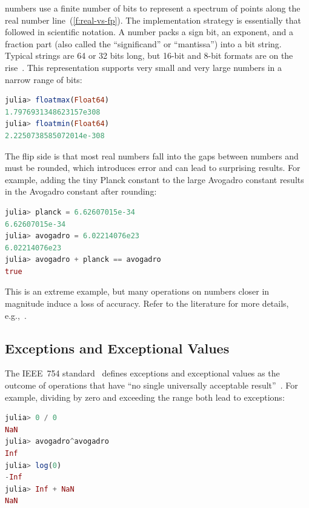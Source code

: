 \documentclass{juliacon}
\begin{document}
\Fp{} numbers use a finite number of bits to represent a spectrum of points along the real number line~(\cref{f:real-vs-fp}).
The implementation strategy is essentially that followed in scientific notation.
A \fp{} number packs a sign bit, an exponent, and a fraction part (also called the ``significand'' or ``mantissa'') into a bit string.
Typical strings are 64 or 32 bits long, but 16-bit and 8-bit formats are on the rise~\cite{klowerLowprecisionClimateComputing2021,fp8,p3109}.
This representation supports very small and very large numbers in a narrow range of bits:

\begin{lstlisting}[language = Julia]
julia> floatmax(Float64)
1.7976931348623157e308
julia> floatmin(Float64)
2.2250738585072014e-308
\end{lstlisting}

The flip side is that most real numbers fall into the gaps between \fp{} numbers and must be rounded, which introduces error
and can lead to surprising results.
For example, adding the tiny Planck constant to the large Avogadro constant results in
the Avogadro constant after rounding:

\begin{lstlisting}[language = Julia]
julia> planck = 6.62607015e-34
6.62607015e-34
julia> avogadro = 6.02214076e23
6.02214076e23
julia> avogadro + planck == avogadro
true
\end{lstlisting}

This is an extreme example, but many operations on \fp{} numbers closer in magnitude induce a loss of accuracy.
Refer to the literature for more details, e.g.,~\cite{knuthArtComputerProgramming1997,torontoPracticallyAccurateFloatingPoint2014,mullerHandbookFloatingPointArithmetic2018}.


\subsection{Exceptions and Exceptional Values}
\label{s:exnvalue}

The IEEE~754 \fp{} standard~\cite{IEEEStandardBinary1985}
defines exceptions and exceptional values as the outcome of
operations that have ``no single universally acceptable result''~\cite{p-draft-1997}.
For example, dividing by zero and exceeding the  range
both lead to exceptions:

\bigskip

\begin{lstlisting}[language = Julia]
julia> 0 / 0
NaN
julia> avogadro^avogadro
Inf
julia> log(0)
-Inf
julia> Inf + NaN
NaN
\end{lstlisting}
\end{document}
